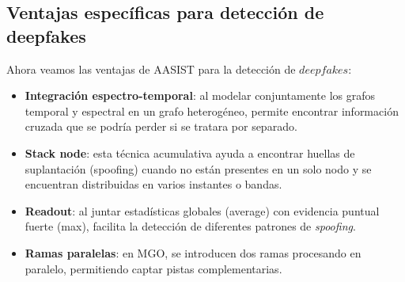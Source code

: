 \subsection*{Ventajas específicas para detección de deepfakes}

Ahora veamos las ventajas de AASIST para la detección de $deepfakes$:

\begin{itemize}
    \item \textbf{Integración espectro-temporal}: al modelar conjuntamente los grafos temporal y espectral en un grafo heterogéneo, permite encontrar información cruzada que se podría perder si se tratara por separado.  
    \item \textbf{Stack node}: esta técnica acumulativa ayuda a encontrar huellas de suplantación (spoofing) cuando no están presentes en un solo nodo y se encuentran distribuidas en varios instantes o bandas.
    \item \textbf{Readout}: al juntar estadísticas globales (average) con evidencia puntual fuerte (max), facilita la detección de diferentes patrones de \textit{spoofing}.
    \item \textbf{Ramas paralelas}: en MGO, se introducen dos ramas procesando en paralelo, permitiendo captar pistas complementarias.
\end{itemize}